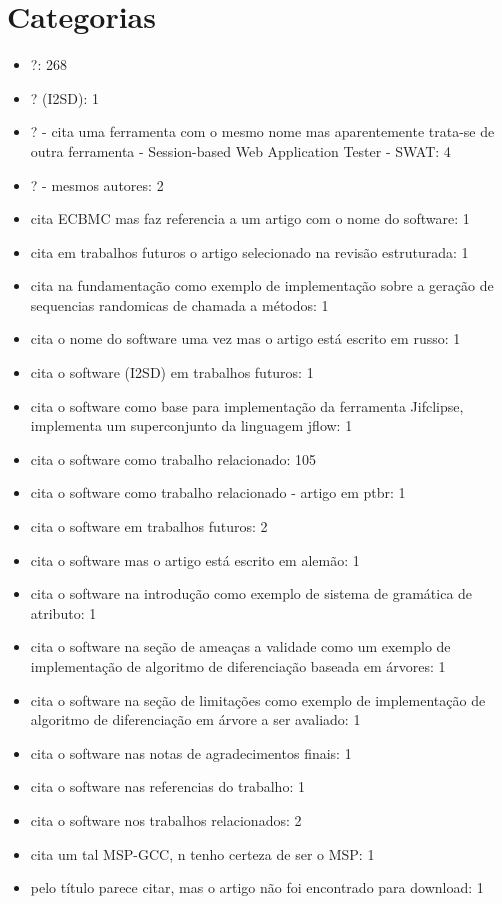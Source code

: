 \section{Categorias}



\begin{itemize}
\item ?: 268
\item ? (I2SD): 1
\item ? - cita uma ferramenta com o mesmo nome mas aparentemente trata-se de outra ferramenta - Session-based Web Application Tester - SWAT: 4
\item ? - mesmos autores: 2
\item cita ECBMC mas faz referencia a um artigo com o nome do software: 1
\item cita em trabalhos futuros o artigo selecionado na revisão estruturada: 1
\item cita na fundamentação como exemplo de implementação sobre a geração de sequencias randomicas de chamada a métodos: 1
\item cita o nome do software uma vez mas o artigo está escrito em russo: 1
\item cita o software (I2SD) em trabalhos futuros: 1
\item cita o software como base para implementação da ferramenta Jifclipse, implementa um superconjunto da linguagem jflow: 1
\item cita o software como trabalho relacionado: 105
\item cita o software como trabalho relacionado - artigo em ptbr: 1
\item cita o software em trabalhos futuros: 2
\item cita o software mas o artigo está escrito em alemão: 1
\item cita o software na introdução como exemplo de sistema de gramática de atributo: 1
\item cita o software na seção de ameaças a validade como um exemplo de implementação de algoritmo de diferenciação baseada em árvores: 1
\item cita o software na seção de limitações como exemplo de implementação de algoritmo de diferenciação em árvore a ser avaliado: 1
\item cita o software nas notas de agradecimentos finais: 1
\item cita o software nas referencias do trabalho: 1
\item cita o software nos trabalhos relacionados: 2
\item cita um tal MSP-GCC, n tenho certeza de ser o MSP: 1
\item pelo título parece citar, mas o artigo não foi encontrado para download: 1
\end{itemize}


